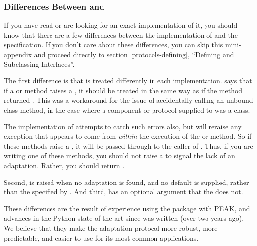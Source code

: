 \begin{verbatim%
}
\begin{verbatim%
}
\begin{seealso}
\end{seealso}


















\newpage
\subsubsection{Differences Between  and }

If you have read  or are looking for an exact implementation of it,
you should know that there are a few differences between the 
implementation of  and the  specification.  If you
don't care about these differences, you can skip this mini-appendix and
proceed directly to section \ref{protocols-defining}, ``Defining and Subclassing
Interfaces''.

The first difference is that  is treated differently in
each implementation.   says that if a  or
 method raises a , it should be
treated in the same way as if the method returned .  This was
a workaround for the issue of accidentally calling an unbound class
method, in the case where a component or protocol supplied to
 was a class.

The  implementation of  attempts to catch
such errors also, but will reraise any exception that appears to come from
\emph{within} the execution of the  or
 method.  So if these methods raise a ,
it will be passed through to the caller of .  Thus, if you
are writing one of these methods, you should not raise a 
to signal the lack of an adaptation.  Rather, you should return .

Second,  is raised when no adaptation is
found, and no default is supplied, rather than the 
specified by .  And third,  has an optional
 argument that the   does not.

These differences are the result of experience using the 
package with PEAK, and advances in the Python state-of-the-art since
 was written (over two years ago).  We believe that they make the
adaptation protocol more robust, more predictable, and easier to use for
its most common applications.






\end{verbatim%
}
\end{verbatim%
}
